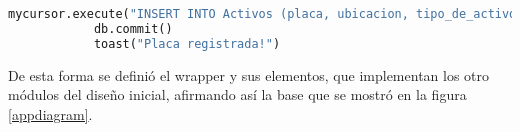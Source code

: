 \begin{lstlisting}[language=Python,frame=single,caption= Registro nuevo de activo (creación propia), inputencoding=latin1]
mycursor.execute("INSERT INTO Activos (placa, ubicacion, tipo_de_activo, descripcion) VALUES (%s, %s, %s, %s)", (self.placa_actual, self.root.ids.ubicacion.text, self.root.ids.active_type.text, self.root.ids.descrip.text))
            db.commit()
            toast("Placa registrada!")
\end{lstlisting}
\par
De esta forma se definió el wrapper y sus elementos, que implementan los otro módulos del diseño inicial, afirmando así la base que se mostró en la figura \ref{appdiagram}. 






